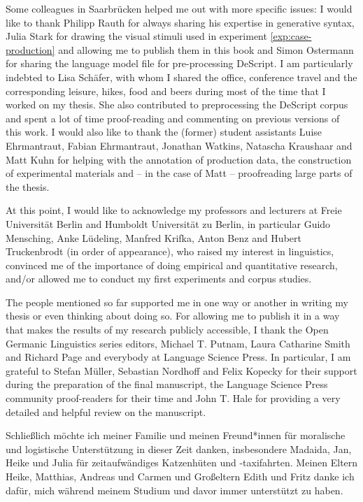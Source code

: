 Some colleagues in Saarbrücken helped me out with more specific issues: I would like to thank Philipp Rauth for always sharing his expertise in generative syntax, Julia Stark for drawing the visual stimuli used in experiment \ref{exp:case-production} and allowing me to publish them in this book and Simon Ostermann for sharing the language model file for pre-processing DeScript. I am particularly indebted to Lisa Schäfer, with whom I shared the office, conference travel and the corresponding leisure, hikes, food and beers during most of the time that I worked on my thesis. She also contributed to preprocessing the DeScript corpus and spent a lot of time proof-reading and commenting on previous versions of this work. I would also like to thank the (former) student assistants Luise Ehrmantraut, Fabian Ehrmantraut, Jonathan Watkins, Natascha Kraushaar and Matt Kuhn for helping with the annotation of production data, the construction of experimental materials and -- in the case of Matt -- proofreading large parts of the thesis.

At this point, I would like to acknowledge my professors and lecturers at Freie Universität Berlin and Humboldt Universität zu Berlin, in particular Guido Mensching, Anke Lüdeling, Manfred Krifka, Anton Benz and Hubert Truckenbrodt (in order of appearance), who raised my interest in linguistics, convinced me of the importance of doing empirical and quantitative research, and/or allowed me to conduct my first experiments and corpus studies.

The people mentioned so far supported me in one way or another in writing my thesis or even thinking about doing so. For allowing me to publish it in a way that makes the results of my research publicly accessible, I thank the Open Germanic Linguistics series editors, Michael T. Putnam, Laura Catharine Smith and Richard Page and everybody at Language Science Press. In particular, I am grateful to Stefan Müller, Sebastian Nordhoff and Felix Kopecky for their support during the preparation of the final manuscript, the Language Science Press community proof-readers for their time and John T. Hale for providing a very detailed and helpful review on the manuscript.

Schließlich möchte ich meiner Familie und meinen Freund*innen für morali\-sche und logistische Unterstützung in dieser Zeit danken, insbesondere Madaida, Jan, Heike und Julia für zeitaufwändiges Katzenhüten und -taxifahrten. Mei\-nen Eltern Heike, Matthias, Andreas und Carmen und Großeltern Edith und Fritz danke ich dafür, mich während meinem Studium und davor immer unterstützt zu haben.
